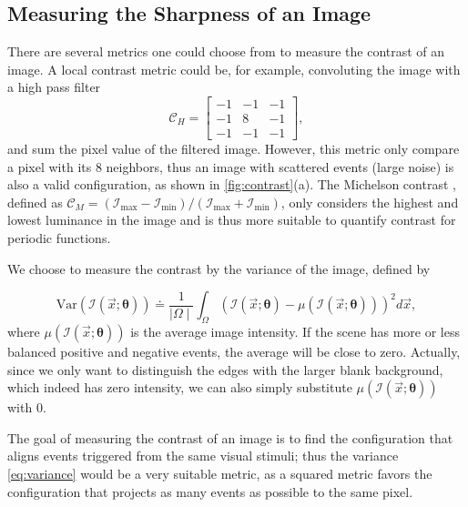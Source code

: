\subsection{Measuring the Sharpness of an Image}
\label{sec:contrast}
There are several metrics one could choose from to measure the
contrast of an image. A local contrast metric could be, for example,
convoluting the image with a high pass filter
\begin{equation}
  \label{eq:high_pass_filter}
  \mathcal{C}_H=
  \begin{bmatrix}
    -1&-1&-1\\
    -1&8&-1\\
    -1&-1&-1
  \end{bmatrix},
\end{equation}
and sum the pixel value of the filtered image. However, this metric
only compare a pixel with its 8 neighbors, thus an image with
scattered events (large noise) is also a valid configuration, as shown
in \cref{fig:contrast}(a). The Michelson contrast
\citep{michelson1995studies}, defined as
$\mathcal{C}_M=\left(\mathcal{I}_{\mathrm{max}}-\mathcal{I}_{\mathrm{min}}\right)/\left(\mathcal{I}_{\mathrm{max}}+\mathcal{I}_{\mathrm{min}}\right)$,
only considers the highest and lowest luminance in the image and is
thus more suitable to quantify contrast for periodic functions.

We choose to measure the contrast by the variance of the image,
defined by

\begin{equation}
  \label{eq:variance}
  \mathrm{Var}\left(\mathcal{I}\left(\vec{x};\bm{\theta}\right)\right)\doteq\frac{1}{\mid\Omega\mid}\int_{\Omega}\left(\mathcal{I}\left(\vec{x};\bm{\theta}\right)-\mu\left(\mathcal{I}\left(\vec{x};\bm{\theta}\right)\right)\right)^2d\vec{x},
\end{equation}
where $\mu\left(\mathcal{I}\left(\vec{x};\bm{\theta}\right)\right)$ is
the average image intensity. If the scene has more or less balanced
positive and negative events, the average will be close to
zero. Actually, since we only want to distinguish the edges with the
larger blank background, which indeed has zero intensity, we can also
simply substitute
$\mu\left(\mathcal{I}\left(\vec{x};\bm{\theta}\right)\right)$ with 0.

The goal of measuring the contrast of an image is to find the
configuration that aligns events triggered from the same visual
stimuli; thus the variance \cref{eq:variance} would be a very suitable
metric, as a squared metric favors the configuration that projects as
many events as possible to the same pixel.

